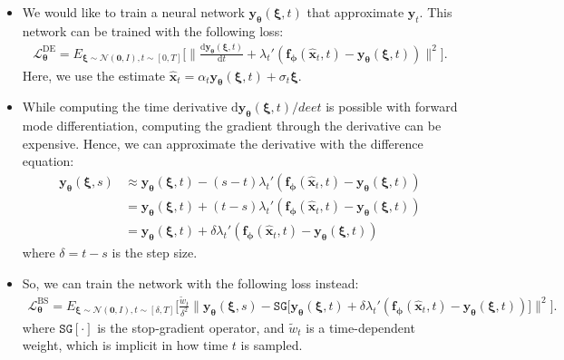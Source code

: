 \documentclass[10pt]{article}
\newcommand{\dee}{\mathrm{d}}
\newcommand{\ve}[1]{\mathbf{#1}}
\newcommand{\ves}[1]{\boldsymbol{#1}}
\newcommand{\mrm}[1]{\mathrm{#1}}
\newcommand{\mcal}[1]{\mathcal{#1}}
\begin{document}
\begin{itemize}
  \item We would like to train a neural network $\ve{y}_{\ves{\theta}}(\ves{\xi},t)$ that approximate $\ve{y}_t$. This network can be trained with the following loss:
  \begin{align*}
    \mcal{L}_{\ves{\theta}}^{\mrm{DE}} 
    = E_{\ves{\xi} \sim \mcal{N}(\ve{0},I), t \sim [0,T]} \bigg[ \bigg\| \frac{\dee \ve{y}_{\ves{\theta}}(\ves{\xi},t)}{\dee t} + \lambda_t' ( \ve{f}_{\ves{\phi}}(\hat{\ve{x}}_t, t)  - \ve{y}_{\ves{\theta}}(\ves{\xi},t) ) \bigg\|^2 \bigg].
  \end{align*}
  Here, we use the estimate $\hat{\ve{x}}_t = \alpha_t \ve{y}_{\ves{\theta}}(\ves{\xi},t) + \sigma_t \ves{\xi}. $

  \item While computing the time derivative $\dee \ve{y}_{\ves{\theta}}(\ves{\xi},t) / dee t$ is possible with forward mode differentiation, computing the gradient through the derivative can be expensive. Hence, we can approximate the derivative with the difference equation:
  \begin{align*}
    \ve{y}_{\ves{\theta}}(\ves{\xi},s) 
    &\approx \ve{y}_{\ves{\theta}}(\ves{\xi},t) - (s-t) \lambda_t' ( \ve{f}_{\ves{\phi}}(\hat{\ve{x}}_t, t)  - \ve{y}_{\ves{\theta}}(\ves{\xi},t) ) \\
    &= \ve{y}_{\ves{\theta}}(\ves{\xi},t) + (t - s) \lambda_t' ( \ve{f}_{\ves{\phi}}(\hat{\ve{x}}_t, t)  - \ve{y}_{\ves{\theta}}(\ves{\xi},t) ) \\
    &= \ve{y}_{\ves{\theta}}(\ves{\xi},t) + \delta \lambda_t' ( \ve{f}_{\ves{\phi}}(\hat{\ve{x}}_t, t)  - \ve{y}_{\ves{\theta}}(\ves{\xi},t) )
  \end{align*}
  where $\delta = t - s$ is the step size.

  \item So, we can train the network with the following loss instead:
  \begin{align*}
    \mcal{L}_{\ves{\theta}}^{\mrm{BS}} 
    = E_{\ves{\xi} \sim \mcal{N}(\ve{0},I), t \sim [\delta,T]} \bigg[ \frac{\tilde{w}_t}{\delta^2} \Big\| \ve{y}_{\ves{\theta}}(\ves{\xi},s) - \texttt{SG}\big[ \ve{y}_{\ves{\theta}}(\ves{\xi},t) + \delta \lambda_t' ( \ve{f}_{\ves{\phi}}(\hat{\ve{x}}_t, t)  - \ve{y}_{\ves{\theta}}(\ves{\xi},t) ) \big] \Big\|^2 \bigg].
  \end{align*}
  where $\texttt{SG}[\cdot]$ is the stop-gradient operator, and $\tilde{w}_t$ is a time-dependent weight, which is implicit in how time $t$ is sampled.


\end{itemize}
\end{document}
